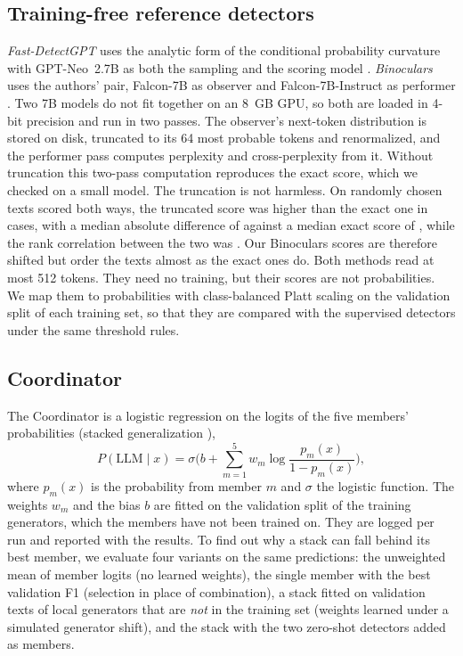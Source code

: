 \documentclass[journal]{IEEEtran}
\begin{document}
\subsection{Training-free reference detectors}
\emph{Fast-DetectGPT} uses the analytic form of the conditional probability curvature with GPT-Neo~2.7B as both the
sampling and the scoring model \cite{Bao_2024}. \emph{Binoculars} uses the authors' pair, Falcon-7B as observer and
Falcon-7B-Instruct as performer \cite{Hans_2024}. Two 7B models do not fit together on an 8~GB GPU, so both are
loaded in 4-bit precision and run in two passes. The observer's next-token distribution is stored on disk,
truncated to its 64 most probable tokens and renormalized, and the performer pass computes perplexity and
cross-perplexity from it. Without truncation this two-pass computation reproduces the exact score, which we checked
on a small model. The truncation is not harmless. On \NBinoCheck{} randomly chosen texts scored both ways, the
truncated score was higher than the exact one in \BinoHigher{} cases, with a median absolute difference of
\BinoMedDiff{} against a median exact score of \BinoMedScore{}, while the rank correlation between the two was
\BinoRho{}. Our Binoculars scores are therefore shifted but order the texts almost as the exact ones do. Both
methods read at most 512 tokens. They need no training, but their scores are not probabilities. We map them to
probabilities with class-balanced Platt scaling on the validation split of each training set, so that they are
compared with the supervised detectors under the same threshold rules.

\subsection{Coordinator}
The Coordinator is a logistic regression on the logits of the five members' probabilities
(stacked generalization \cite{Wolpert_1992}),
\begin{equation}
P(\text{LLM} \mid x) = \sigma\Big(b + \sum_{m=1}^{5} w_m \log\frac{p_m(x)}{1 - p_m(x)}\Big),
\end{equation}
where $p_m(x)$ is the probability from member $m$ and $\sigma$ the logistic function. The weights $w_m$ and the bias
$b$ are fitted on the validation split of the training generators, which the members have not been trained on.
They are logged per run and reported with the results. To find out why a stack can fall behind its best member, we
evaluate four variants on the same predictions: the unweighted mean of member logits (no learned weights), the
single member with the best validation F1 (selection in place of combination), a stack fitted on validation texts
of local generators that are \emph{not} in the training set (weights learned under a simulated generator shift), and
the stack with the two zero-shot detectors added as members.
\end{document}

